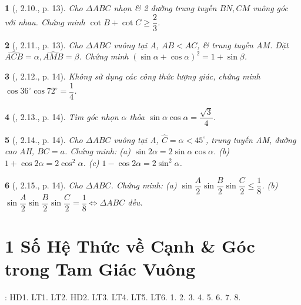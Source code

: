 \documentclass{article}
\newtheorem{baitoan}{}
\begin{document}
\begin{baitoan}[\cite{TLCT_THCS_Toan_9_hinh_hoc}, 2.10., p. 13]
	Cho $\Delta ABC$ nhọn \& 2 đường trung tuyến $BN,CM$ vuông góc với nhau. Chứng minh $\cot B + \cot C\ge\dfrac{2}{3}$.
\end{baitoan}

\begin{baitoan}[\cite{TLCT_THCS_Toan_9_hinh_hoc}, 2.11., p. 13]
	Cho $\Delta ABC$ vuông tại A, $AB < AC$, \& trung tuyến AM. Đặt $\widehat{ACB} = \alpha,\widehat{AMB} = \beta$. Chứng minh $(\sin\alpha + \cos\alpha)^2 = 1 + \sin\beta$.
\end{baitoan}

\begin{baitoan}[\cite{TLCT_THCS_Toan_9_hinh_hoc}, 2.12., p. 14]
	Không sử dụng các công thức lượng giác, chứng minh $\cos36^\circ\cos72^\circ = \dfrac{1}{4}$.
\end{baitoan}

\begin{baitoan}[\cite{TLCT_THCS_Toan_9_hinh_hoc}, 2.13., p. 14]
	Tìm góc nhọn $\alpha$ thỏa $\sin\alpha\cos\alpha = \dfrac{\sqrt{3}}{4}$.
\end{baitoan}

\begin{baitoan}[\cite{TLCT_THCS_Toan_9_hinh_hoc}, 2.14., p. 14]
	Cho $\Delta ABC$ vuông tại A, $\widehat{C} = \alpha < 45^\circ$, trung tuyến AM, đường cao AH, $BC = a$. Chứng minh: (a) $\sin2\alpha = 2\sin\alpha\cos\alpha$. (b) $1 + \cos2\alpha = 2\cos^2\alpha$. (c) $1 - \cos2\alpha = 2\sin^2\alpha$.
\end{baitoan}

\begin{baitoan}[\cite{TLCT_THCS_Toan_9_hinh_hoc}, 2.15., p. 14]
	Cho $\Delta ABC$. Chứng minh: (a) $\sin\dfrac{A}{2}\sin\dfrac{B}{2}\sin\dfrac{C}{2}\le\dfrac{1}{8}$. (b) $\sin\dfrac{A}{2}\sin\dfrac{B}{2}\sin\dfrac{C}{2} = \dfrac{1}{8}\Leftrightarrow\Delta ABC$ đều.
\end{baitoan}


\section{1 Số Hệ Thức về Cạnh \& Góc trong Tam Giác Vuông}
\cite[Chap. IV, \S2, pp. 82--87]{SGK_Toan_9_Canh_Dieu_tap_1}: HD1. LT1. LT2. HD2. LT3. LT4. LT5. LT6. 1. 2. 3. 4. 5. 6. 7. 8.
\end{document}
